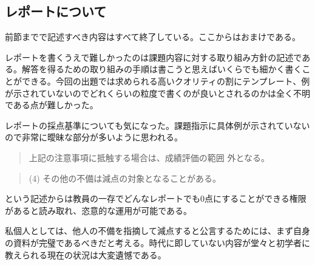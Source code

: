 \documentclass[dvipdfmx,12pt,a4j]{jarticle}
\begin{document}
\subsection{レポートについて}
前節までで記述すべき内容はすべて終了している。ここからはおまけである。

レポートを書くうえで難しかったのは課題内容に対する取り組み方針の記述である。解答を得るための取り組みの手順は書こうと思えばいくらでも細かく書くことができる。今回の出題では求められる高いクオリティの割にテンプレート、例が示されていないのでどれくらいの粒度で書くのが良いとされるのかは全く不明である点が難しかった。

レポートの採点基準についても気になった。課題指示に具体例が示されていないので非常に曖昧な部分が多いように思われる。
\begin{quote}
  上記の注意事項に抵触する場合は、成績評価の範囲
外となる。
\end{quote}

\begin{quote}
  (4) その他の不備は減点の対象となることがある。
\end{quote}
という記述からは教員の一存でどんなレポートでも0点にすることができる権限があると読み取れ、恣意的な運用が可能である。

私個人としては、他人の不備を指摘して減点すると公言するためには、まず自身の資料が完璧であるべきだと考える。時代に即していない内容が堂々と初学者に教えられる現在の状況は大変遺憾である。



\end{document}
